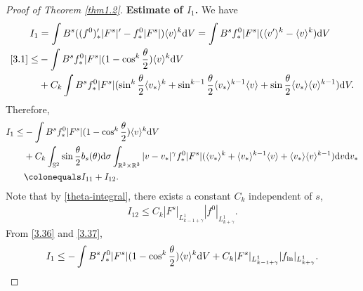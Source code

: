 \documentclass[reqno,10pt]{amsart}
\def\th{\theta}
\newcommand{\beq}{\begin{equation}}
\newcommand{\eeq}{\end{equation}}
\newcommand{\ben}{\begin{eqnarray}}
\newcommand{\een}{\end{eqnarray}}
\theoremstyle{definition}
\numberwithin{equation}{section}
\begin{document}
\begin{proof}[Proof of Theorem \ref{thm1.2}]
\textbf{Estimate of $I_1$.} We have
$$
\begin{aligned}
    I_1&=\int B^s((f^0)'_*|F^s|'-f^0_*|F^s|)\langle v\rangle^k\mathrm{d}V=\int B^s f^0_*|F^s|(\langle v'\rangle^k-\langle v\rangle^k)\mathrm{d}V\\
    \eqref{3.1}\le &-\int B^s f^0_*|F^s|(1-\cos^{k}\frac{\th}{2})\langle v\rangle^k\mathrm{d}V\\
    &+C_k\int B^s f^0_*|F^s|(\sin^k\frac{\th}{2}\langle v_*\rangle^k+\sin^{k-1}\frac{\th}{2}\langle v_*\rangle^{k-1}\langle v\rangle+\sin\frac{\th}{2}\langle v_*\rangle\langle v\rangle^{k-1})\mathrm{d}V.
\end{aligned}
$$
Therefore,
\beq\label{3.36}
\begin{aligned}
I_1\le&-\int B^s f^0_*|F^s|(1-\cos^{k}\frac{\th}{2})\langle v\rangle^k\mathrm{d}V\\
&+C_k\int_{\mathbb{S}^2}\sin\frac{\th}{2}b_s(\th)\mathrm{d}\sigma\int_{\mathbb{R}^3\times\mathbb{R}^3} |v-v_*|^\gamma f^0_*|F^s|(\langle v_*\rangle^k+\langle v_*\rangle^{k-1}\langle v\rangle+\langle v_*\rangle\langle v\rangle^{k-1})\mathrm{d}v\mathrm{d}v_*\\
&\colonequals I_{11}+I_{12}.
\end{aligned}
\eeq
Note that by \eqref{theta-integral}, there exists a constant $C_k$ independent of $s$,
\ben\label{3.37}
I_{12}\le C_k|F^s|_{L^1_{k-1+\gamma}}|f^0|_{L^1_{k+\gamma}}.
\een
From \eqref{3.36} and \eqref{3.37},
\ben\label{3.38}
I_{1}\le -\int B^s f^0_*|F^s|(1-\cos^{k}\frac{\th}{2})\langle v\rangle^k\mathrm{d}V+C_k|F^s|_{L^1_{k-1+\gamma}}|f_{\textup{in}}|_{L^1_{k+\gamma}}.
\een


\end{proof}
\end{document}
